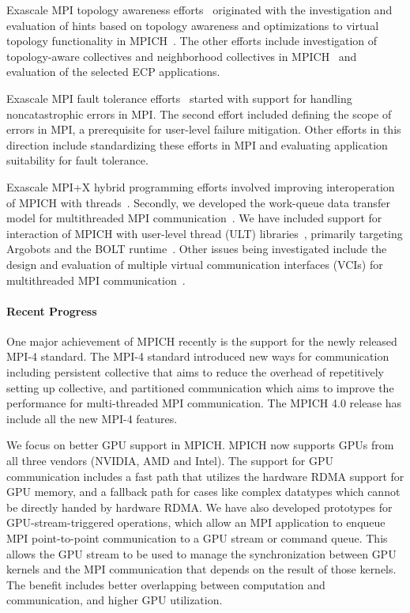 Exascale MPI topology awareness efforts~\cite{Topo1,Topo2} originated
with the investigation and evaluation of hints based on topology
awareness and optimizations to virtual topology functionality in
MPICH~\cite{topo-io,topo-io2}. The other efforts include investigation
of topology-aware collectives and neighborhood collectives in
MPICH~\cite{coll} and evaluation of the selected ECP applications.

Exascale MPI fault tolerance efforts~\cite{FT1, FT2} started with
support for handling noncatastrophic errors in MPI. The second effort
included defining the scope of errors in MPI, a prerequisite for
user-level failure mitigation. Other efforts in this direction
include standardizing these efforts in MPI and evaluating application
suitability for fault tolerance.

Exascale MPI+X hybrid programming efforts involved
improving interoperation of MPICH with threads~\cite{interthread}.
Secondly, we developed the work-queue data transfer model for
multithreaded MPI communication~\cite{workq}. We have included support
for interaction of MPICH with user-level thread (ULT)
libraries~\cite{ULT}, primarily targeting Argobots and the BOLT
runtime~\cite{BOLT}.  Other issues being investigated include the
design and evaluation of multiple virtual communication
interfaces (VCIs) for multithreaded MPI communication~\cite{VCI}.

\paragraph{Recent Progress}

One major achievement of MPICH recently is the support for the newly
released MPI-4 standard. The MPI-4 standard introduced new ways for
communication including persistent collective that aims to reduce the
overhead of repetitively setting up collective, and partitioned
communication which aims to improve the performance for multi-threaded
MPI communication. The MPICH 4.0 release has include all the new MPI-4 
features.

We focus on better GPU support in MPICH. MPICH now supports
GPUs from all three vendors (NVIDIA, AMD and Intel). The support for
GPU communication includes a fast path that utilizes the hardware RDMA
support for GPU memory, and a fallback path for cases like complex
datatypes which cannot be directly handed by hardware RDMA. We have
also developed prototypes for GPU-stream-triggered operations, which allow
an MPI application to enqueue MPI point-to-point communication to a GPU
stream or command queue. This allows the GPU stream to be used to manage
the synchronization between GPU kernels and the MPI communication that
depends on the result of those kernels. The benefit includes better
overlapping between computation and communication, and higher GPU
utilization.

